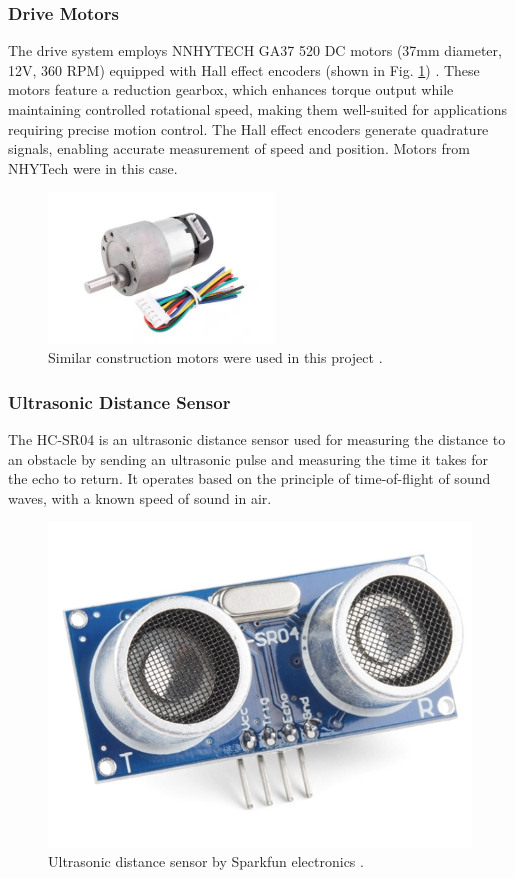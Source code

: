 \documentclass{article}
\begin{document}
\subsubsection{Drive Motors}
The drive system employs NNHYTECH GA37 520 DC motors (37mm diameter, 12V, 360 RPM) equipped with Hall effect encoders (shown in Fig. \ref{fig:dc-motor}) \cite{dc-motor}. These motors feature a reduction gearbox, which enhances torque output while maintaining controlled rotational speed, making them well-suited for applications requiring precise motion control. The Hall effect encoders generate quadrature signals, enabling accurate measurement of speed and position. Motors from NHYTech were in this case.
\begin{figure}[H]
    \centering
    \includegraphics[height=4cm]{assets/dc-motor-with-encoder.jpg}
    \caption{Similar construction motors were used in this project \cite{dc-motor}.}
    \label{fig:dc-motor}
\end{figure}

\subsubsection{Ultrasonic Distance Sensor}
The HC-SR04 is an ultrasonic distance sensor used for measuring the distance to an obstacle by sending an ultrasonic pulse and measuring the time it takes for the echo to return. It operates based on the principle of time-of-flight of sound waves, with a known speed of sound in air.
\begin{figure}[H]
    \centering
    \includegraphics[width=0.25\linewidth]{assets/Ultrasonic-HC-SR04.png}
    \caption{Ultrasonic distance sensor by  Sparkfun electronics \cite{ultra-sonic}.}
    \label{fig:ultra-sonic}
\end{figure}
\end{document}
